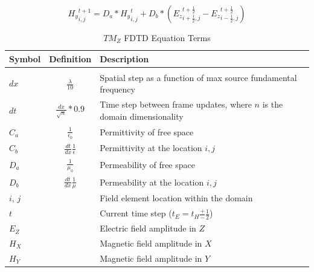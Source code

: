 \begin{equation} \label{eq:hyupdate}
{H_y}_{i,j}^{t+1} = D_a * {H_y}_{i,j}^{t} + D_b * (
{E_z}_{i+\frac{1}{2},j}^{t+\frac{1}{2}} 
-
{E_z}_{i-\frac{1}{2},j}^{t+\frac{1}{2}}
)  
\end{equation}

\begin{table}[h!]
	\centering
	\caption{$TM_Z$ FDTD Equation Terms}
	\label{tab:modelColorComponentUsage}
	\begin{tabular}{l | c | l}
		Symbol	& Definition & Description \\
		\hline				\\										 	 
		$dx$ 	& $\frac{\lambda}{10}$ 			& Spatial step as a function of max source  fundamental frequency 					\\
		$dt$ 	& $\frac{dx}{\sqrt{n}} * 0.9$		& Time step between frame updates, where $n$ is the domain dimensionality \\		$C_a$	& $\frac{1}{\epsilon_0}$ & Permittivity of free space	\\
		$C_b$	& $\frac{dt}{dx}  \frac{1}{\epsilon} $ & Permittivity at the location $i,j$\\
		$D_a$	& $\frac{1}{\mu_0}$	& Permeability of free space \\
		$D_b$	& $\frac{dt}{dx}\frac{1}{\mu}$	& Permeability at the location $i,j$\\
		$i$, $j$ 	& &	Field element location within the domain  \\
		$t$   	& &	Current time step ($t_E = t_H \frac{+}{-}\frac{1}{2}$) \\
		$E_Z$ 	& & Electric field amplitude in $Z$ \\
		$H_X$ 	& & Magnetic field amplitude in $X$ \\
		$H_Y$	& & Magnetic field amplitude in $Y$ \\
	\end{tabular}
\end{table}

